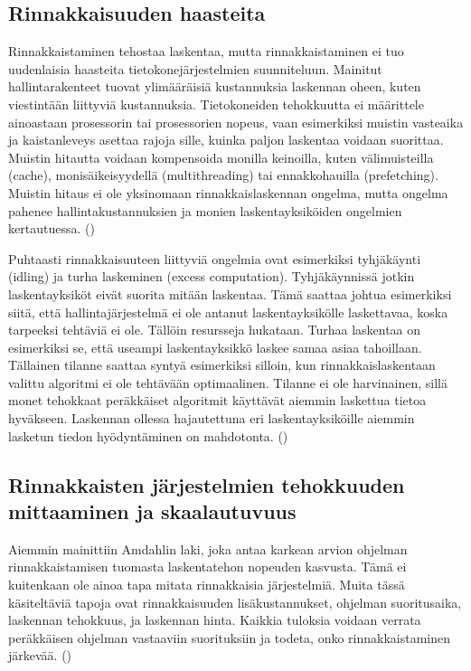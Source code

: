 \subsection{Rinnakkaisuuden haasteita}

Rinnakkaistaminen tehostaa laskentaa, mutta rinnakkaistaminen ei tuo
uudenlaisia haasteita tietokonejärjestelmien suunniteluun. Mainitut
hallintarakenteet tuovat ylimääräisiä kustannuksia laskennan oheen,
kuten viestintään liittyviä kustannuksia.
Tietokoneiden tehokkuutta ei määrittele ainoastaan prosessorin tai
prosessorien nopeus, vaan esimerkiksi muistin vasteaika ja kaistanleveys
asettaa rajoja sille, kuinka paljon laskentaa voidaan suorittaa. Muistin
hitautta voidaan kompensoida monilla keinoilla, kuten välimuisteilla (cache),
monisäikeisyydellä (multithreading) tai ennakkohauilla (prefetching). Muistin
hitaus ei ole yksinomaan rinnakkaislaskennan ongelma, mutta ongelma pahenee
hallintakustannuksien ja monien laskentayksiköiden ongelmien kertautuessa.
(\cite{intro})

Puhtaasti rinnakkaisuuteen liittyviä ongelmia ovat esimerkiksi tyhjäkäynti
(idling) ja turha laskeminen (excess computation). Tyhjäkäynnissä jotkin
laskentayksiköt eivät suorita mitään laskentaa. Tämä saattaa johtua esimerkiksi
siitä, että hallintajärjestelmä ei ole antanut laskentayksikölle laskettavaa,
koska tarpeeksi tehtäviä ei ole. Tällöin resursseja hukataan. Turhaa
laskentaa on esimerkiksi se, että useampi laskentayksikkö laskee samaa asiaa
tahoillaan. Tällainen tilanne saattaa syntyä esimerkiksi silloin, kun
rinnakkaislaskentaan valittu algoritmi ei ole tehtävään optimaalinen. Tilanne
ei ole harvinainen, sillä monet tehokkaat peräkkäiset algoritmit käyttävät
aiemmin laskettua tietoa hyväkseen. Laskennan ollessa hajautettuna eri
laskentayksiköille aiemmin lasketun tiedon hyödyntäminen on mahdotonta.
(\cite{intro})

\subsection{Rinnakkaisten järjestelmien tehokkuuden mittaaminen ja skaalautuvuus}

Aiemmin mainittiin Amdahlin laki, joka antaa karkean arvion ohjelman
rinnakkaistamisen tuomasta laskentatehon nopeuden kasvusta. Tämä ei kuitenkaan
ole ainoa tapa mitata rinnakkaisia järjestelmiä. Muita tässä käsiteltäviä tapoja
ovat rinnakkaisuuden lisäkustannukset, ohjelman suoritusaika, laskennan
tehokkuus, ja laskennan hinta. Kaikkia tuloksia voidaan verrata peräkkäisen
ohjelman vastaaviin suorituksiin ja todeta, onko rinnakkaistaminen järkevää.
(\cite{intro})

